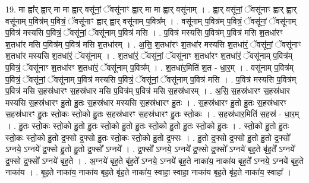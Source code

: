 \documentclass[17pt]{extarticle}
\begin{document}
19. मा ह्वा᳚र् ह्वा॒र् मा मा ह्वा॒र् वसू॑नां॒ ॅवसू॑नाꣳ ह्वा॒र् मा मा ह्वा॒र् वसू॑नाम् । . ह्वा॒र् वसू॑नां॒ ॅवसू॑नाꣳ ह्वार् ह्वा॒र् वसू॑नाम् प॒वित्र॑म् प॒वित्रं॒ ॅवसू॑नाꣳ ह्वार् ह्वा॒र् वसू॑नाम् प॒वित्र᳚म् । . वसू॑नाम् प॒वित्र॑म् प॒वित्रं॒ ॅवसू॑नां॒ ॅवसू॑नाम् प॒वित्र॑ मस्यसि प॒वित्रं॒ ॅवसू॑नां॒ ॅवसू॑नाम् 
प॒वित्र॑ मसि । . प॒वित्र॑ मस्यसि प॒वित्र॑म् प॒वित्र॑ मसि श॒तधा॑रꣳ श॒तधा॑र मसि प॒वित्र॑म् प॒वित्र॑ मसि श॒तधा॑रम् । . अ॒सि॒ श॒तधा॑रꣳ श॒तधा॑र मस्यसि श॒तधा॑रं॒ ॅवसू॑नां॒ ॅवसू॑नाꣳ श॒तधा॑र मस्यसि श॒तधा॑रं॒ ॅवसू॑नाम् । . श॒तधा॑रं॒ ॅवसू॑नां॒ ॅवसू॑नाꣳ श॒तधा॑रꣳ श॒तधा॑रं॒ ॅवसू॑नाम् प॒वित्र॑म् प॒वित्रं॒ ॅवसू॑नाꣳ श॒तधा॑रꣳ श॒तधा॑रं॒ ॅवसू॑नाम् प॒वित्र᳚म् । . श॒तधा॑र॒मिति॑ श॒त - धा॒र॒म् । . वसू॑नाम् प॒वित्र॑म् प॒वित्रं॒ ॅवसू॑नां॒ ॅवसू॑नाम् प॒वित्र॑ मस्यसि प॒वित्रं॒ ॅवसू॑नां॒ ॅवसू॑नाम् 
प॒वित्र॑ मसि । . प॒वित्र॑ मस्यसि प॒वित्र॑म् प॒वित्र॑ मसि स॒हस्र॑धारꣳ स॒हस्र॑धार मसि प॒वित्र॑म् प॒वित्र॑ मसि स॒हस्र॑धारम् । . अ॒सि॒ स॒हस्र॑धारꣳ स॒हस्र॑धार मस्यसि स॒हस्र॑धारꣳ हु॒तो हु॒तः स॒हस्र॑धार मस्यसि स॒हस्र॑धारꣳ हु॒तः । . स॒हस्र॑धारꣳ हु॒तो हु॒तः स॒हस्र॑धारꣳ स॒हस्र॑धारꣳ हु॒तः स्तो॒कः स्तो॒को हु॒तः स॒हस्र॑धारꣳ स॒हस्र॑धारꣳ हु॒तः स्तो॒कः । . स॒हस्र॑धार॒मिति॑ स॒हस्र॑ - धा॒र॒म् । . हु॒तः स्तो॒कः स्तो॒को हु॒तो हु॒तः स्तो॒को हु॒तो हु॒तः स्तो॒को हु॒तो हु॒तः स्तो॒को हु॒तः । . स्तो॒को हु॒तो हु॒तः स्तो॒कः स्तो॒को हु॒तो द्र॒फ्सो द्र॒फ्सो हु॒तः स्तो॒कः स्तो॒को हु॒तो द्र॒फ्सः । . हु॒तो द्र॒फ्सो द्र॒फ्सो हु॒तो हु॒तो द्र॒फ्सो᳚ ऽग्नये॒ ऽग्नये᳚ द्र॒फ्सो हु॒तो हु॒तो द्र॒फ्सो᳚ ऽग्नये᳚ । . द्र॒फ्सो᳚ ऽग्नये॒ ऽग्नये᳚ द्र॒फ्सो द्र॒फ्सो᳚ ऽग्नये॑ बृह॒ते बृ॑ह॒ते᳚ ऽग्नये᳚ द्र॒फ्सो द्र॒फ्सो᳚ ऽग्नये॑ बृह॒ते । . अ॒ग्नये॑ बृह॒ते बृ॑ह॒ते᳚ ऽग्नये॒ ऽग्नये॑ बृह॒ते नाका॑य॒ नाका॑य बृह॒ते᳚ ऽग्नये॒ ऽग्नये॑ बृह॒ते नाका॑य । . बृ॒ह॒ते नाका॑य॒ नाका॑य बृह॒ते बृ॑ह॒ते नाका॑य॒ स्वाहा॒ स्वाहा॒ नाका॑य बृह॒ते बृ॑ह॒ते नाका॑य॒ स्वाहा᳚ । \newline
\end{document}
